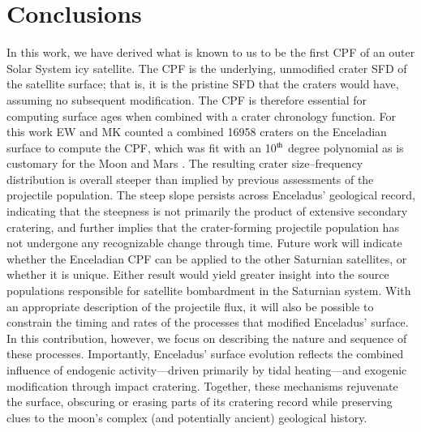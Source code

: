 \documentclass[preprint,11pt,3p,times,authoryear]{elsarticle}
\begin{document}
{\section{Conclusions}
\label{sect:conclusion}
In this work, we have derived what is known to us to be the first CPF of an outer Solar System icy satellite. The CPF is the underlying, unmodified crater SFD of the satellite surface; that is, it is the pristine SFD that the craters would have, assuming no subsequent modification. The CPF is therefore essential for computing surface ages when combined with a crater chronology function.
For this work EW and MK counted a combined 16958 craters on the Enceladian surface to compute the CPF, which was fit with an 10$^{\rm th}$ degree polynomial as is customary for the Moon and Mars \citep{Neukum1975, Neukum2001,Ivanov2001}. 
The resulting crater size–frequency distribution is overall steeper than implied by previous assessments of the projectile population. The steep slope persists across Enceladus’ geological record, indicating that the steepness is not primarily the product of extensive secondary cratering, and further implies that the crater-forming projectile population has not undergone any recognizable change through time.
Future work will indicate whether the Enceladian CPF can be applied to the other Saturnian satellites, or whether it is unique. Either result would yield greater insight into the source populations responsible for satellite bombardment in the Saturnian system.
With an appropriate description of the projectile flux, it will also be possible to constrain the timing and rates of the processes that modified Enceladus’ surface. In this contribution, however, we focus on describing the nature and sequence of these processes. Importantly, Enceladus’ surface evolution reflects the combined influence of endogenic activity—driven primarily by tidal heating—and exogenic modification through impact cratering. 
Together, these mechanisms rejuvenate the surface, obscuring or erasing parts of its cratering record while preserving clues to the moon’s complex (and potentially ancient) geological history.


}
\end{document}
